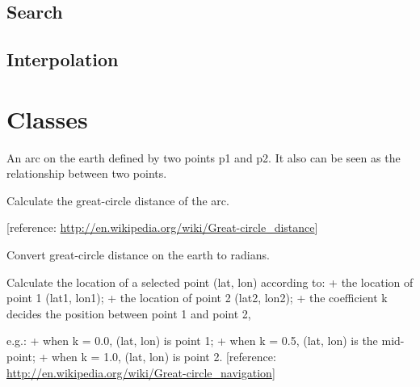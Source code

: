 \documentclass[letterpaper,10pt,english]{sphinxmanual}
\begin{document}
\section{Search}
\label{regridding:search}

\section{Interpolation}
\label{regridding:interpolation}

\chapter{Classes}
\label{code:classes}\label{code:module-pyesg}\label{code::doc}

\begin{fulllineitems}
\label{code:pyesg.Arc}
An arc on the earth defined by two points p1 and p2.
It also can be seen as the relationship between two points.

\begin{fulllineitems}
\label{code:pyesg.Arc.distance}
Calculate the great-circle distance of the arc.

{[}reference: \href{http://en.wikipedia.org/wiki/Great-circle\_distance}{http://en.wikipedia.org/wiki/Great-circle\_distance}{]}

\end{fulllineitems}


\begin{fulllineitems}
\label{code:pyesg.Arc.rad}
Convert great-circle distance on the earth to radians.

\end{fulllineitems}


\begin{fulllineitems}
\label{code:pyesg.Arc.waypoint}
Calculate the location of a selected point (lat, lon) according to:
+ the location of point 1 (lat1, lon1);
+ the location of point 2 (lat2, lon2);
+ the coefficient k decides the position between point 1 and point 2,

e.g.:
+ when k = 0.0, (lat, lon) is point 1;
+ when k = 0.5, (lat, lon) is the mid-point;
+ when k = 1.0, (lat, lon) is point 2.
{[}reference: \href{http://en.wikipedia.org/wiki/Great-circle\_navigation}{http://en.wikipedia.org/wiki/Great-circle\_navigation}{]}

\end{fulllineitems}


\end{fulllineitems}
\end{document}
